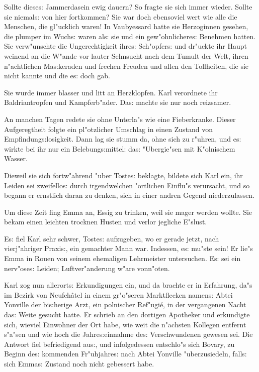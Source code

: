 \documentclass[oneside,12pt]{book}
\newcommand{\s}{s:}%
\begin{document}
Sollte diese{\s} Jammerdasein ewig dauern? So fragte sie sich
immer wieder. Sollte sie niemal{\s} von hier fortkommen? Sie war
doch ebensoviel wert wie alle die Menschen, die gl"ucklich waren!
In Vaubyessard hatte sie Herzoginnen gesehen, die plumper im
Wuch{\s} waren al{\s} sie und ein gew"ohnlichere{\s} Benehmen
hatten. Sie verw"unschte die Ungerechtigkeit ihre{\s}
Sch"opfer{\s} und dr"uckte ihr Haupt weinend an die W"ande vor
lauter Sehnsucht nach dem Tumult der Welt, ihren n"achtlichen
Ma{\s}keraden und frechen Freuden und allen den Tollheiten, die
sie nicht kannte und die e{\s} doch gab.

Sie wurde immer blasser und litt an Herzklopfen. Karl verordnete
ihr Baldriantropfen und Kampferb"ader. Da{\s} machte sie nur noch
reizsamer.

An manchen Tagen redete sie ohne Unterla"s wie eine Fieberkranke.
Dieser Aufgeregtheit folgte ein pl"otzlicher Umschlag in einen
Zustand von Empfindung{\s}losigkeit. Dann lag sie stumm da, ohne
sich zu r"uhren, und e{\s} wirkte bei ihr nur ein
Belebung{\s}mittel: da{\s} "Ubergie"sen mit K"olnischem Wasser.

Dieweil sie sich fortw"ahrend "uber Toste{\s} beklagte, bildete
sich Karl ein, ihr Leiden sei zweifello{\s} durch irgendwelchen
"ortlichen Einflu"s verursacht, und so begann er ernstlich daran
zu denken, sich in einer andren Gegend niederzulassen.

Um diese Zeit fing Emma an, Essig zu trinken, weil sie mager
werden wollte. Sie bekam einen leichten trocknen Husten und verlor
jegliche E"slust.

E{\s} fiel Karl sehr schwer, Toste{\s} aufzugeben, wo er gerade
jetzt, nach vierj"ahriger Praxi{\s}, ein gemachter Mann war.
Indessen, e{\s} mu"ste sein! Er lie"s Emma in Rouen von seinem
ehemaligen Lehrmeister untersuchen. E{\s} sei ein nerv"ose{\s}
Leiden; Luftver"anderung w"are vonn"oten.

Karl zog nun allerort{\s} Erkundigungen ein, und da brachte er in
Erfahrung, da"s im Bezirk von Neufch\^atel in einem gr"o"seren
Marktflecken namen{\s} Abtei Yonville der bi{\s}herige Arzt, ein
polnischer Ref"ugi\'e, in der vergangenen Nacht da{\s} Weite
gesucht hatte. Er schrieb an den dortigen Apotheker und erkundigte
sich, wieviel Einwohner der Ort habe, wie weit die n"achsten
Kollegen entfernt s"a"sen und wie hoch die Jahre{\s}einnahme
de{\s} Verschwundenen gewesen sei. Die Antwort fiel befriedigend
au{\s}, und infolgedessen entschlo"s sich Bovary, zu Beginn de{\s}
kommenden Fr"uhjahre{\s} nach Abtei Yonville "uberzusiedeln,
fall{\s} sich Emma{\s} Zustand noch nicht gebessert habe.
\end{document}
